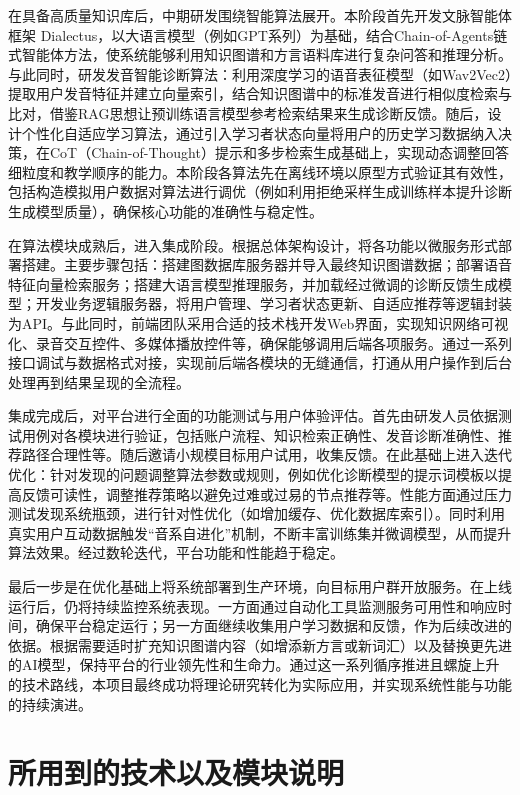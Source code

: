 在具备高质量知识库后，中期研发围绕智能算法展开。本阶段首先开发文脉智能体框架 Dialectus，以大语言模型（例如GPT系列）为基础，结合Chain-of-Agents链式智能体方法，使系统能够利用知识图谱和方言语料库进行复杂问答和推理分析。与此同时，研发发音智能诊断算法：利用深度学习的语音表征模型（如Wav2Vec2）提取用户发音特征并建立向量索引，结合知识图谱中的标准发音进行相似度检索与比对，借鉴RAG思想让预训练语言模型参考检索结果来生成诊断反馈。随后，设计个性化自适应学习算法，通过引入学习者状态向量将用户的历史学习数据纳入决策，在CoT（Chain-of-Thought）提示和多步检索生成基础上，实现动态调整回答细粒度和教学顺序的能力。本阶段各算法先在离线环境以原型方式验证其有效性，包括构造模拟用户数据对算法进行调优（例如利用拒绝采样生成训练样本提升诊断生成模型质量），确保核心功能的准确性与稳定性。

在算法模块成熟后，进入集成阶段。根据总体架构设计，将各功能以微服务形式部署搭建。主要步骤包括：搭建图数据库服务器并导入最终知识图谱数据；部署语音特征向量检索服务；搭建大语言模型推理服务，并加载经过微调的诊断反馈生成模型；开发业务逻辑服务器，将用户管理、学习者状态更新、自适应推荐等逻辑封装为API。与此同时，前端团队采用合适的技术栈开发Web界面，实现知识网络可视化、录音交互控件、多媒体播放控件等，确保能够调用后端各项服务。通过一系列接口调试与数据格式对接，实现前后端各模块的无缝通信，打通从用户操作到后台处理再到结果呈现的全流程。

集成完成后，对平台进行全面的功能测试与用户体验评估。首先由研发人员依据测试用例对各模块进行验证，包括账户流程、知识检索正确性、发音诊断准确性、推荐路径合理性等。随后邀请小规模目标用户试用，收集反馈。在此基础上进入迭代优化：针对发现的问题调整算法参数或规则，例如优化诊断模型的提示词模板以提高反馈可读性，调整推荐策略以避免过难或过易的节点推荐等。性能方面通过压力测试发现系统瓶颈，进行针对性优化（如增加缓存、优化数据库索引）。同时利用真实用户互动数据触发“音系自进化”机制，不断丰富训练集并微调模型，从而提升算法效果。经过数轮迭代，平台功能和性能趋于稳定。

最后一步是在优化基础上将系统部署到生产环境，向目标用户群开放服务。在上线运行后，仍将持续监控系统表现。一方面通过自动化工具监测服务可用性和响应时间，确保平台稳定运行；另一方面继续收集用户学习数据和反馈，作为后续改进的依据。根据需要适时扩充知识图谱内容（如增添新方言或新词汇）以及替换更先进的AI模型，保持平台的行业领先性和生命力。通过这一系列循序推进且螺旋上升的技术路线，本项目最终成功将理论研究转化为实际应用，并实现系统性能与功能的持续演进。

\section{所用到的技术以及模块说明}
